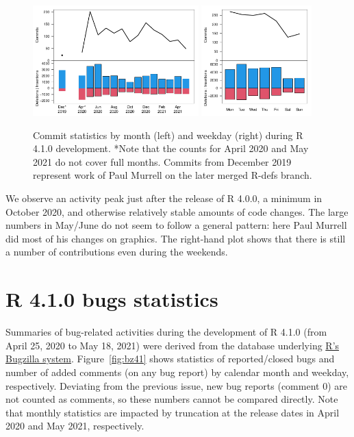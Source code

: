 \begin{figure}[htb]
\centering
\includegraphics[width=0.57\textwidth]{svnplot_mon41}
\includegraphics[width=0.38\textwidth]{svnplot_wd41}
\caption{Commit statistics by month (left) and weekday (right) during R 4.1.0 development.
*Note that the counts for April 2020 and May 2021 do not cover full months.
Commits from December 2019 represent work of Paul Murrell on the later
merged R-defs branch.}
\label{fig:svn41} \end{figure}

We observe an activity peak just after the release of R 4.0.0, a minimum in
October 2020, and otherwise relatively stable amounts of code changes.
The large numbers in May/June do not seem to follow a general
pattern: here Paul Murrell did most of his changes on graphics.
The right-hand plot shows that there is still a number of contributions even during the
weekends.

\section{R 4.1.0 bugs statistics}

Summaries of bug-related activities during the development of R 4.1.0 (from
April 25, 2020 to May 18, 2021) were derived from the database underlying
\href{https://bugs.R-project.org/bugzilla/}{R's Bugzilla system}. 
Figure~\ref{fig:bz41} shows statistics of reported/closed bugs and number of
added comments (on any bug report) by calendar month and weekday,
respectively.
Deviating from the previous issue, new bug reports (comment 0) are not
counted as comments, so these numbers cannot be compared directly.
Note that monthly statistics are impacted by truncation at the release
dates in April 2020 and May 2021, respectively.

